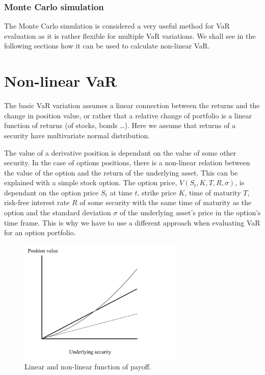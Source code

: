 \documentclass[a4paper, 12pt]{article}
\theoremstyle{definition}
\theoremstyle{plain}
\theoremstyle{definition}
\begin{document}
\subsubsection{Monte Carlo simulation}

The Monte Carlo simulation is considered a very useful method for VaR evaluation
as it is rather flexible for multiple VaR variations. We shall see in the 
following sections how it can be used to calculate non-linear VaR. 

\section{Non-linear VaR}

The basic VaR variation assumes a linear connection between the returns and the change in position value,
or rather that a relative change of portfolio is a linear function of returns (of stocks, bonds \dots).
Here we assume that returns of a security have multivariate normal distribution.

The value of a derivative position is dependant on the value of some other security.
In the case of options positions, there is a non-linear relation between the 
value of the option and the return of the underlying asset.
This can be explained with a simple stock option. The option price, $V(S_t,K,T,R,\sigma)$, is 
dependant on the option price $S_t$ at time $t$, strike price $K$, time of maturity $T$,
risk-free interest rate $R$ of some security with the same time of maturity as the option and 
the standard deviation $\sigma$ of the underlying asset's price in the option's time frame.
This is why we have to use a different approach when evaluating VaR for an option portfolio.


\begin{figure}\label{payoff}
    \includegraphics[width=0.7\textwidth]{payoff.jpg}
    \caption{Linear and non-linear function of payoff.}
\end{figure}
\end{document}
